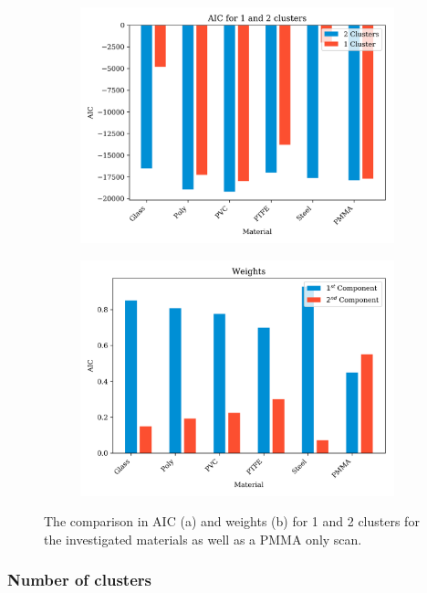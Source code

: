 \documentclass[a4paper,11pt]{article}
\begin{document}
\begin{figure}[htbp]
    \centering
    \begin{subfigure}[b]{0.48\textwidth}
        \includegraphics[width=\textwidth]{figures/AIC.png}
    \end{subfigure}
    \begin{subfigure}[b]{0.48\textwidth}
        \includegraphics[width=\textwidth]{figures/weights.png}
    \end{subfigure}
    \caption{The comparison in AIC (a) and weights (b) for 1 and 2 clusters for the investigated materials as well as a PMMA only scan.}
    \label{n_bins}
\end{figure}

\subsubsection{Number of clusters}
\end{document}
